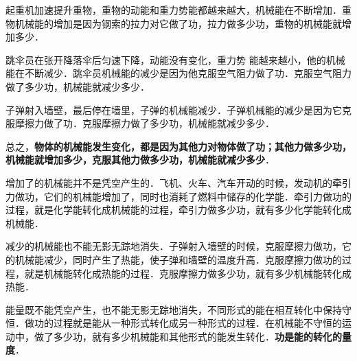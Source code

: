 起重机加速提升重物，重物的动能和重力势能都越来越大，机械能在不断增加．重物机械能的增加是因为钢索的拉力对它做了功，拉力做多少功，重物的机械能就增加多少．

跳伞员在张开降落伞后匀速下降，动能没有变化，重力势
能越来越小，他的机械能在不断减少．跳伞员机械能的减少是因为他克服空气阻力做了功．克服空气阻力做了多少功，机械能就减少多少．

子弹射入墙壁，最后停在墙里，子弹的机械能减少．子弹机械能的减少是因为它克服摩擦力做了功．克服摩擦力做了多少功，机械能就减少多少．

总之，\textbf{物体的机械能发生变化，都是因为其他力对物体做了功；其他力做多少功，机械能就增加多少，克服其他力做多少功，机械能就减少多少}．

增加了的机械能并不是凭空产生的．飞机、火车、汽车开动的时候，发动机的牵引力做功，它们的机械能增加了，同时也消耗了燃料中储存的化学能．牵引力做功的过程，就是化学能转化成机械能的过程，牵引力做多少功，就有多少化学能转化成机械能．

减少的机械能也不能无影无踪地消失．子弹射入墙壁的时候，克服摩擦力做功，它的机械能减少，同时产生了热能，使子弹和墙壁的温度升高．克服摩擦力做功的过程，就是机械能转化成热能的过程．克服摩擦力做多少功，就有多少机械能转化成热能．

能量既不能凭空产生，也不能无影无踪地消失，不同形式的能在相互转化中保持守恒．做功的过程就是能从一种形式转化成另一种形式的过程．在机械能不守恒的运动中，做了多少功，就有多少机械能和其他形式的能发生转化．\textbf{功是能的转化的量度}．
\newpage
